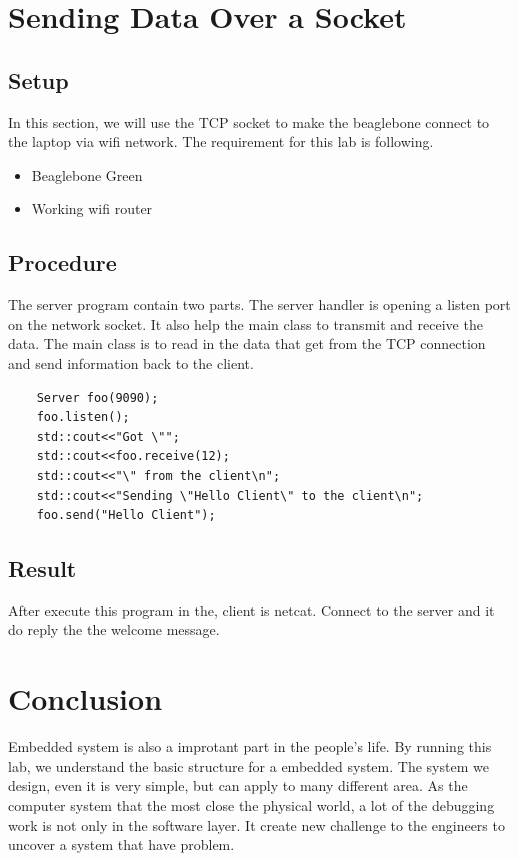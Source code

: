 \documentclass{article}
\begin{document}
\section{Sending Data Over a Socket}
\subsection{Setup}
In this section, we will use the TCP socket to make the beaglebone connect to the laptop via wifi network. The requirement for this lab is following.
\begin{itemize}
	\item Beaglebone Green
	\item Working wifi router
\end{itemize}
\subsection{Procedure}
The server program contain two parts. The server handler is opening a listen port on the network socket. It also help the main class to transmit and receive the data. The main class is to read in the data that get from the TCP connection and send information back to the client.
\begin{lstlisting}
	Server foo(9090);
	foo.listen();
	std::cout<<"Got \"";
	std::cout<<foo.receive(12);
	std::cout<<"\" from the client\n";
	std::cout<<"Sending \"Hello Client\" to the client\n";
	foo.send("Hello Client");
\end{lstlisting}
\subsection{Result}
After execute this program in the, client is netcat. Connect to the server and it do reply the the welcome message. 
\clearpage
\section{Conclusion}
Embedded system is also a improtant part in the people's life. By running this lab, we understand the basic structure for a embedded system. The system we design, even it is very simple, but can apply to many different area. As the computer system that the most close the physical world, a lot of the debugging work is not only in the software layer. It create new challenge to the engineers to uncover a system that have problem.
\end{document}
